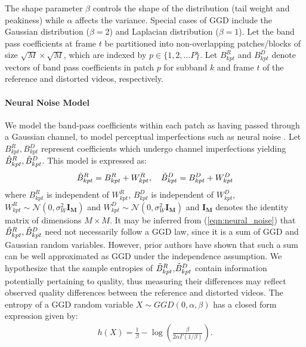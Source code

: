 \documentclass[journal]{IEEEtran}
\begin{document}
The shape parameter $\beta$ controls the shape of the distribution (tail weight and peakiness) while $\alpha$ affects the variance. Special cases of GGD include the Gaussian distribution ($\beta = 2$) and Laplacian distribution ($\beta = 1$). Let the band pass coefficients at frame $t$ be partitioned into non-overlapping patches/blocks of size $\sqrt{M} \times \sqrt{M}$, which are indexed by $p \in \{ 1,2, \ldots P \}$. Let $B_{kpt}^R$ and $B_{kpt}^D$ denote vectors of band pass coefficients in patch $p$ for subband $k$ and frame $t$ of the reference and distorted videos, respectively. 

\paragraph*{\textbf{Neural Noise Model}} We model the band-pass coefficients within each patch as having passed through a Gaussian channel, to model perceptual imperfections such as neural noise \cite{sheikh2006image,soundararajan2012video}. Let $B_{kpt}^R,B_{kpt}^D$ represent coefficients which undergo channel imperfections yielding $\Tilde{B}_{kpt}^R,\Tilde{B}_{kpt}^D$. This model is expressed as:
\begin{align}
    \Tilde{B}_{kpt}^R = B_{kpt}^R + W_{kpt}^R, \quad \Tilde{B}_{kpt}^D = B_{kpt}^D + W_{kpt} ^D
    \label{eqn:neural_noise}
\end{align}
where $B_{kpt}^R$ is independent of $W_{kpt}^R$, $B_{kpt}^D$ is independent of $W_{kpt}^D$, $W_{kpt}^R \sim \mathcal{N}(0,\sigma_W ^2 \mathbf{I_M})$ and $W_{kpt}^D \sim \mathcal{N}(0,\sigma_W ^2 \mathbf{I_M})$ and $\mathbf{I_M}$ denotes the identity matrix of dimensions $M \times M$. It may be inferred from (\ref{eqn:neural_noise}) that $\Tilde{B}_{kpt}^R,\Tilde{B}_{kpt}^D$ need not necessarily follow a GGD law, since it is a sum of GGD and Gaussian random variables. However, prior authors \cite{zhao2004sum,soury2015new} have shown that such a sum can be well approximated as GGD under the independence assumption. We hypothesize that the sample entropies of $\Tilde{B}_{kpt}^R$,$\Tilde{B}_{kpt}^D$ contain information potentially pertaining to quality, thus measuring their differences may reflect observed quality differences between the reference and distorted videos. The entropy of a GGD random variable $X \sim GGD(0,\alpha,\beta)$ has a closed form expression given by:
\begin{align}
    h(X) = \frac{1}{\beta} - \log \left(\frac{\beta}{2\alpha\Gamma(1/\beta) }\right).
    \label{eqn:ggd_entropy}
\end{align}
\end{document}
